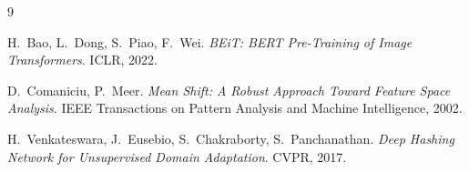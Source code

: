 \documentclass[11pt]{article}
\begin{document}
\begin{thebibliography}{9}

H.~Bao, L.~Dong, S.~Piao, F.~Wei.
\emph{BEiT: BERT Pre-Training of Image Transformers}.
ICLR, 2022.

D.~Comaniciu, P.~Meer.
\emph{Mean Shift: A Robust Approach Toward Feature Space Analysis}.
IEEE Transactions on Pattern Analysis and Machine Intelligence, 2002.

H.~Venkateswara, J.~Eusebio, S.~Chakraborty, S.~Panchanathan.
\emph{Deep Hashing Network for Unsupervised Domain Adaptation}.
CVPR, 2017.

\end{thebibliography}
\end{document}

